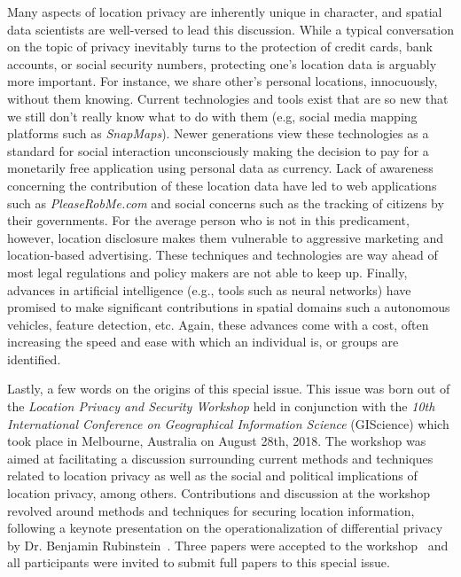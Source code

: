 \documentclass{josised}
\begin{document}
Many aspects of location privacy are inherently unique in character, and spatial data scientists are well-versed to lead this discussion. While a typical conversation on the topic of privacy inevitably turns to the protection of credit cards, bank accounts, or social security numbers, protecting one's location data is arguably more important.  For instance, we share other’s personal locations, innocuously, without them knowing.  Current technologies and tools exist that are so new that we still don’t really know what to do with them (e.g, social media mapping platforms such as \textit{SnapMaps}).  Newer generations view these technologies as a standard for social interaction unconsciously making the decision to pay for a monetarily free application using personal data as currency.  Lack of awareness concerning the contribution of these location data have led to web applications such as \textit{PleaseRobMe.com} and social concerns such as the tracking of citizens by their governments.  For the average person who is not in this predicament, however, location disclosure makes them vulnerable to aggressive marketing and location-based advertising. These techniques and technologies are way ahead of most legal regulations and policy makers are not able to keep up.  Finally, advances in artificial intelligence (e.g., tools such as neural networks) have promised to make significant contributions in spatial domains such a autonomous vehicles, feature detection, etc.  Again, these advances come with a cost,  often increasing the speed and ease with which an individual is, or groups are identified.

Lastly, a few words on the origins of this special issue.  This issue was born out of the \textit{Location Privacy and Security Workshop} held in conjunction with the \textit{10th International Conference on Geographical Information Science} (GIScience) which took place in Melbourne, Australia on August 28th, 2018.  The workshop was aimed at facilitating a discussion surrounding current methods and techniques related to location privacy as well as the social and political implications of location privacy, among others. Contributions and discussion at the workshop revolved around methods and techniques for securing location information, following a keynote presentation on the operationalization of differential privacy by Dr. Benjamin Rubinstein~\cite{rubinstein2017diffpriv}.   Three papers were accepted to the workshop~\cite{naghizadeseeking,gao2018,liu2018} and all participants were invited to submit full papers to this special issue.
\end{document}
